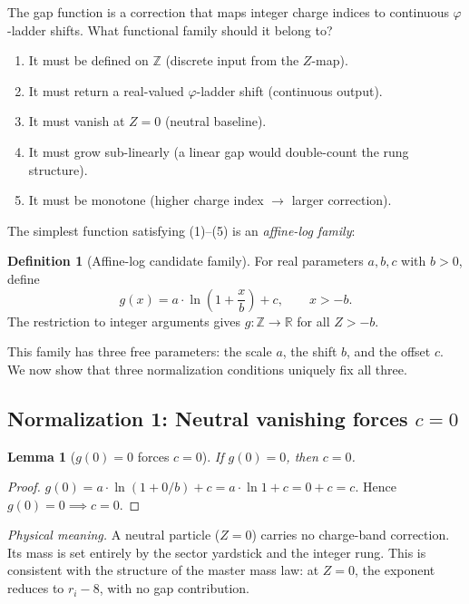 \documentclass[11pt,a4paper]{article}
\newtheorem{lemma}[theorem]{Lemma}
\theoremstyle{definition}
\newtheorem{definition}[theorem]{Definition}
\theoremstyle{remark}
\newcommand{\phig}{\varphi}
\newcommand{\Zidx}{Z}
\begin{document}
The gap function is a correction that maps integer charge indices to
continuous $\phig$-ladder shifts.  What functional family should it belong to?

\begin{enumerate}[nosep]
  \item It must be defined on $\mathbb{Z}$ (discrete input from the
        $\Zidx$-map).
  \item It must return a real-valued $\phig$-ladder shift (continuous output).
  \item It must vanish at $\Zidx = 0$ (neutral baseline).
  \item It must grow sub-linearly (a linear gap would double-count the
        rung structure).
  \item It must be monotone (higher charge index $\to$ larger correction).
\end{enumerate}

The simplest function satisfying (1)--(5) is an \emph{affine-log family}:

\begin{definition}[Affine-log candidate family]
\label{def:affine_log}
For real parameters $a, b, c$ with $b > 0$, define
\begin{equation}
  g(x) = a \cdot \ln\!\left(1 + \frac{x}{b}\right) + c,
  \qquad x > -b.
  \label{eq:gap_family}
\end{equation}
The restriction to integer arguments gives $g : \mathbb{Z} \to \mathbb{R}$
for all $\Zidx > -b$.
\end{definition}

\noindent
This family has three free parameters: the scale $a$, the shift $b$, and the
offset $c$.  We now show that three normalization conditions uniquely fix all
three.

\subsection{Normalization 1: Neutral vanishing forces $c = 0$}

\begin{lemma}[$g(0) = 0$ forces $c = 0$]
\label{lem:gap_c}
If $g(0) = 0$, then $c = 0$.
\end{lemma}

\begin{proof}
$g(0) = a \cdot \ln(1 + 0/b) + c = a \cdot \ln 1 + c = 0 + c = c$.
Hence $g(0) = 0 \implies c = 0$.
\end{proof}

\noindent
\textit{Physical meaning.}\quad
A neutral particle ($\Zidx = 0$) carries no charge-band correction.  Its mass
is set entirely by the sector yardstick and the integer rung.  This is
consistent with the structure of the master mass law: at $\Zidx = 0$, the
exponent reduces to $r_i - 8$, with no gap contribution.
\end{document}
